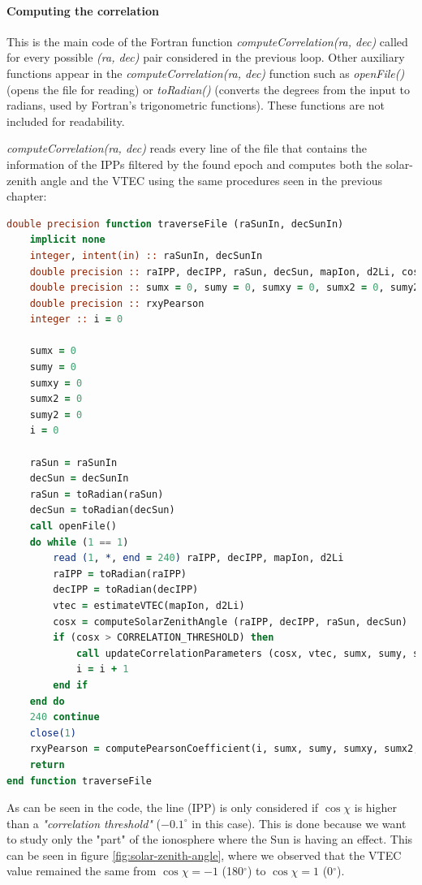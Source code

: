 \paragraph{Computing the correlation}

This is the main code of the Fortran function \textit{computeCorrelation(ra, dec)} called for every possible \textit{(ra, dec)} pair considered in the previous loop. Other auxiliary functions appear in the \textit{computeCorrelation(ra, dec)} function such as \textit{openFile()} (opens the file for reading) or \textit{toRadian()} (converts the degrees from the input to radians, used by Fortran's trigonometric functions). These functions are not included for readability.

\textit{computeCorrelation(ra, dec)} reads every line of the file that contains the information of the IPPs filtered by the found epoch and computes both the solar-zenith angle and the VTEC using the same procedures seen in the previous chapter:

\begin{lstlisting}[language=Fortran, caption=Correlation computation]
double precision function traverseFile (raSunIn, decSunIn)
	implicit none
	integer, intent(in) :: raSunIn, decSunIn
	double precision :: raIPP, decIPP, raSun, decSun, mapIon, d2Li, cosX, vtec
	double precision :: sumx = 0, sumy = 0, sumxy = 0, sumx2 = 0, sumy2 = 0
	double precision :: rxyPearson
	integer :: i = 0
	
	sumx = 0
	sumy = 0
	sumxy = 0
	sumx2 = 0
	sumy2 = 0
	i = 0
	
	raSun = raSunIn
	decSun = decSunIn
	raSun = toRadian(raSun)
	decSun = toRadian(decSun)
	call openFile()
	do while (1 == 1)
		read (1, *, end = 240) raIPP, decIPP, mapIon, d2Li
		raIPP = toRadian(raIPP)
		decIPP = toRadian(decIPP)
		vtec = estimateVTEC(mapIon, d2Li)
		cosx = computeSolarZenithAngle (raIPP, decIPP, raSun, decSun)
		if (cosx > CORRELATION_THRESHOLD) then
			call updateCorrelationParameters (cosx, vtec, sumx, sumy, sumxy, sumx2, sumy2)
			i = i + 1
		end if	
	end do
	240 continue
	close(1)
	rxyPearson = computePearsonCoefficient(i, sumx, sumy, sumxy, sumx2, sumy2)
	return
end function traverseFile
\end{lstlisting}

As can be seen in the code, the line (IPP) is only considered if $\cos\chi$ is higher than a \textit{"correlation threshold"} ($-0.1^{\circ}$ in this case). This is done because we want to study only the "part" of the ionosphere where the Sun is having an effect. This can be seen in figure \ref{fig:solar-zenith-angle}, where we observed that the VTEC value remained the same from $\cos\chi = -1$ (180$^{\circ}$) to $\cos\chi = 1$ (0$^{\circ}$).


